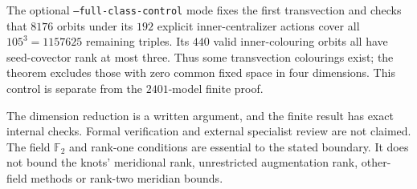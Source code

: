 \documentclass[11pt]{article}
\newcommand{\F}{\mathbb F}
\begin{document}
The optional \texttt{--full-class-control} mode fixes the first
transvection and checks that $8176$ orbits under its $192$ explicit
inner-centralizer actions cover all $105^3=1157625$ remaining triples.
Its $440$ valid inner-colouring orbits all have seed-covector rank at
most three. Thus some transvection colourings exist; the theorem
excludes those with zero common fixed space in four dimensions.
This control is separate from the $2401$-model finite proof.

The dimension reduction is a written argument, and the finite result
has exact internal checks. Formal verification and external specialist
review are not claimed. The field $\F_2$ and rank-one conditions are
essential to the stated boundary. It does not bound the knots'
meridional rank, unrestricted augmentation rank, other-field methods
or rank-two meridian bounds.
\end{document}
